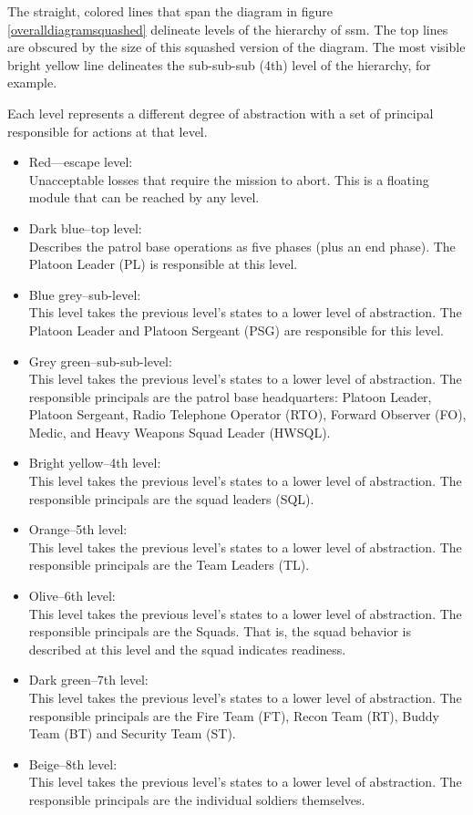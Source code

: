 \documentclass[../../main/main.tex]{subfiles}
\begin{document}
The straight, colored lines that span the diagram in figure \ref{overalldiagramsquashed} delineate levels of the hierarchy of \gls{ssm}.  The top lines are obscured by the size of this squashed version of the diagram.  The most visible bright yellow line delineates the sub-sub-sub (4th) level of the hierarchy, for example.

Each level represents a different degree of abstraction with a set of principal responsible for actions at that level. 
\begin{itemize}
\item Red---escape level:\\
Unacceptable losses that require the mission to abort.  This is a floating module that can be reached by any level.
\item Dark blue--top level:\\
Describes the patrol base operations as five phases (plus an end phase).  The Platoon Leader (PL)  is responsible at this level.
\item Blue grey--sub-level:\\
This level takes the previous level's states to a lower level of abstraction.  The Platoon Leader and Platoon Sergeant (PSG) are responsible for this level.
\item Grey green--sub-sub-level:\\
This level takes the previous level's states to a lower level of abstraction.  The responsible principals are the patrol base headquarters: Platoon Leader, Platoon Sergeant, Radio Telephone Operator (RTO), Forward Observer (FO), Medic, and Heavy Weapons Squad Leader (HWSQL).
\item Bright yellow--4th level:\\
This level takes the previous level's states to a lower level of abstraction. The responsible principals are the squad leaders (SQL).
\item Orange--5th level:\\
This level takes the previous level's states to a lower level of abstraction.  The responsible principals are the Team Leaders (TL).
\item Olive--6th level:\\
This level takes the previous level's states to a lower level of abstraction.   The responsible principals are the Squads.  That is, the squad behavior is described at this level and the squad indicates readiness.
\item Dark green--7th level:\\
This level takes the previous level's states to a lower level of abstraction. The responsible principals are the Fire Team (FT), Recon Team (RT), Buddy Team (BT) and Security Team (ST).
\item Beige--8th level:\\
This level takes the previous level's states to a lower level of abstraction.  The responsible principals are the individual soldiers themselves.
\end{itemize}
\end{document}
